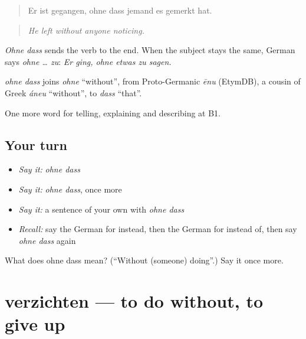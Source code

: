 \begin{quote}
Er ist gegangen, ohne dass jemand es gemerkt hat.
\end{quote}

\begin{quote}
\emph{He left without anyone noticing.}
\end{quote}

\emph{Ohne dass} sends the verb to the end. When the subject stays the same, German says \emph{ohne … zu}: \emph{Er ging, ohne etwas zu sagen.}

\begin{cousinweb}
\emph{ohne dass} joins \emph{ohne} \textquotedblleft{}without\textquotedblright{}, from Proto-Germanic \emph{ēnu} (EtymDB), a cousin of Greek \emph{áneu} \textquotedblleft{}without\textquotedblright{}, to \emph{dass} \textquotedblleft{}that\textquotedblright{}.
\end{cousinweb}

\begin{grammarlens}[title={What you've built}]
One more word for telling, explaining and describing at B1.
\end{grammarlens}

\subsection*{Your turn}
\begin{itemize}
\raggedright
  \item \emph{Say it:} \emph{ohne dass}
  \item \emph{Say it:} \emph{ohne dass}, once more
  \item \emph{Say it:} a sentence of your own with \emph{ohne dass}
  \item \emph{Recall:} say the German for instead, then the German for instead of, then say \emph{ohne dass} again
\end{itemize}

\begin{tcolorbox}[breakable,colback=teal!4,colframe=teal!35!black,title={Before you move on}]
What does ohne dass mean? (\textquotedblleft{}Without (someone) doing\textquotedblright{}.) Say it once more.
\end{tcolorbox}
\section[verzichten]{verzichten — to do without, to give up}

\label{lesson:GE-C368-verzichten}




